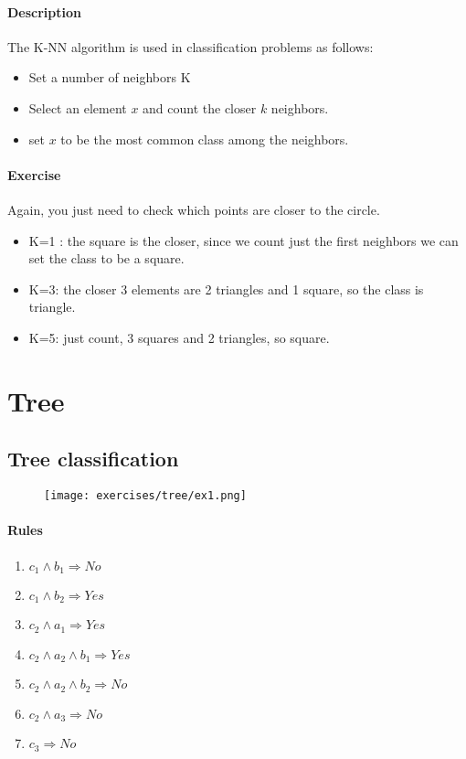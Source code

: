 \paragraph{Description}
The K-NN algorithm is used in classification problems as follows:
\begin{itemize}
\item Set a number of neighbors K
\item Select an element $x$ and count the closer $k$ neighbors.
\item set $x$ to be the most common class among the neighbors.
\end{itemize}

\paragraph{Exercise}
Again, you just need to check which points are closer to the circle. 
\begin{itemize}
\item K=1 : the square is the closer, since we count just the first neighbors we can set the class to be a square.
\item K=3: the closer 3 elements are 2 triangles and 1 square, so the class is triangle.
\item K=5: just count, 3 squares and 2 triangles, so square.
\end{itemize}





\section{Tree}

\subsection{Tree classification}
\begin{figure}[H]
    \centering
    \texttt{[image: exercises/tree/ex1.png]}
\end{figure}

\paragraph{Rules}
\begin{enumerate}

\item $c_1 \wedge b_1 \Rightarrow No $
\item $c_1 \wedge b_2 \Rightarrow Yes $
\item $c_2 \wedge a_1 \Rightarrow Yes $
\item $c_2 \wedge a_2 \wedge b_1 \Rightarrow Yes $
\item $c_2 \wedge a_2 \wedge b_2 \Rightarrow No $
\item $c_2 \wedge a_3 \Rightarrow No $
\item $c_3  \Rightarrow No $
\end{enumerate}

